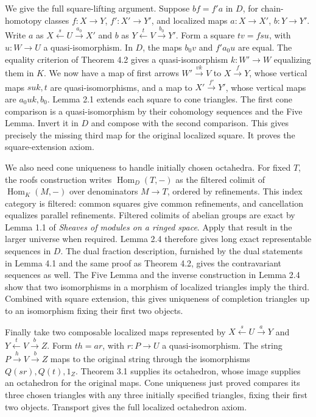 \documentclass[
  english,
  11pt,
  a4paper,
]{article}
\begin{document}
We give the full square-lifting argument. Suppose \(bf=f'a\) in \(D\),
for chain-homotopy classes \(f:X\to Y\), \(f':X'\to Y'\), and localized
maps \(a:X\to X'\), \(b:Y\to Y'\). Write \(a\) as
\(X\xleftarrow{s}U\xrightarrow{a_0}X'\) and \(b\) as
\(Y\xleftarrow{t}V\xrightarrow{b_0}Y'\). Form a square \(tv=fsu\), with
\(u:W\to U\) a quasi-isomorphism. In \(D\), the maps \(b_0v\) and
\(f'a_0u\) are equal. The equality criterion of Theorem 4.2 gives a
quasi-isomorphism \(k:W'\to W\) equalizing them in \(K\). We now have a
map of first arrows \(W'\xrightarrow{vk}V\) to \(X\xrightarrow fY\),
whose vertical maps \(suk,t\) are quasi-isomorphisms, and a map to
\(X'\xrightarrow{f'}Y'\), whose vertical maps are \(a_0uk,b_0\). Lemma
2.1 extends each square to cone triangles. The first cone comparison is
a quasi-isomorphism by their cohomology sequences and the Five Lemma.
Invert it in \(D\) and compose with the second comparison. This gives
precisely the missing third map for the original localized square. It
proves the square-extension axiom.

We also need cone uniqueness to handle initially chosen octahedra. For
fixed \(T\), the roofs construction writes \(\operatorname{Hom}_D(T,-)\)
as the filtered colimit of \(\operatorname{Hom}_K(M,-)\) over
denominators \(M\to T\), ordered by refinements. This index category is
filtered: common squares give common refinements, and cancellation
equalizes parallel refinements. Filtered colimits of abelian groups are
exact by Lemma 1.1 of \emph{Sheaves of modules on a ringed space}. Apply
that result in the larger universe when required. Lemma 2.4 therefore
gives long exact representable sequences in \(D\). The dual fraction
description, furnished by the dual statements in Lemma 4.1 and the same
proof as Theorem 4.2, gives the contravariant sequences as well. The
Five Lemma and the inverse construction in Lemma 2.4 show that two
isomorphisms in a morphism of localized triangles imply the third.
Combined with square extension, this gives uniqueness of completion
triangles up to an isomorphism fixing their first two objects.

Finally take two composable localized maps represented by
\(X\xleftarrow{s}U\xrightarrow aY\) and
\(Y\xleftarrow{t}V\xrightarrow bZ\). Form \(th=ar\), with \(r:P\to U\) a
quasi-isomorphism. The string \(P\xrightarrow hV\xrightarrow bZ\) maps
to the original string through the isomorphisms \(Q(sr),Q(t),1_Z\).
Theorem 3.1 supplies its octahedron, whose image supplies an octahedron
for the original maps. Cone uniqueness just proved compares its three
chosen triangles with any three initially specified triangles, fixing
their first two objects. Transport gives the full localized octahedron
axiom.
\end{document}

